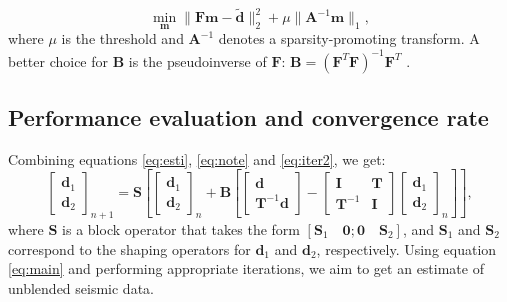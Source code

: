 \begin{equation}
\label{eq:leastreg}
\min_{\mathbf{m}} \parallel \mathbf{Fm-\tilde{d}} \parallel_2^2 +\mu\parallel\mathbf{A}^{-1}\mathbf{m}\parallel_1,%
\end{equation}
where $\mu$ is the threshold and $\mathbf{A}^{-1}$ denotes a sparsity-promoting transform. 
A better choice for $\mathbf{B}$ is the pseudoinverse of $\mathbf{F}$: $\mathbf{B}=(\mathbf{F}^T\mathbf{F})^{-1}\mathbf{F}^T$ \cite[]{daubechies2008}.
\subsection{Performance evaluation and convergence rate}
Combining equations \ref{eq:esti}, \ref{eq:note} and \ref{eq:iter2}, we get: 
\begin{equation}
\label{eq:main}
\left[\begin{array}{cc}
\mathbf{d}_1\\
\mathbf{d}_2
\end{array}\right]_{n+1}=\mathbf{S}
\left[
\left[\begin{array}{cc}
\mathbf{d}_1\\
\mathbf{d}_2
\end{array}\right]_n+
\mathbf{B}\left[\left[\begin{array}{cc}
\mathbf{d}\\
\mathbf{T}^{-1}\mathbf{d}
\end{array}\right]-\left[\begin{array}{cc}
\mathbf{I}	& \mathbf{T}\\
\mathbf{T}^{-1} & \mathbf{I}
\end{array}\right]
\left[\begin{array}{cc}
\mathbf{d}_1\\
\mathbf{d}_2
\end{array}\right]_n
\right]\right],
\end{equation}
where $\mathbf{S}$ is a block operator that takes the form
$[\mathbf{S}_1\quad \mathbf{0};\mathbf{0}\quad\mathbf{S}_2]$, and $\mathbf{S}_1$ and $\mathbf{S}_2$ correspond to the shaping operators for $\mathbf{d}_1$ and $\mathbf{d}_2$, respectively. Using equation \ref{eq:main} and performing appropriate iterations, we aim to get an estimate of unblended seismic data.

